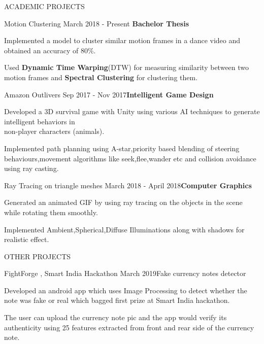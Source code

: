 \documentclass{resume} %
\begin{document}
\begin{rSection}{ACADEMIC PROJECTS}
\begin{rSubsection}{Motion Clustering} {March 2018 - Present }{\textbf{Bachelor Thesis}}{}
\item Implemented a model to cluster similar motion frames in a dance video and obtained an accuracy of 80\%.
\item Used \textbf{Dynamic Time Warping}(DTW) for measuring similarity between two motion frames and \textbf{Spectral Clustering} for clustering them.
\end{rSubsection}  


\begin{rSubsection}{Amazon Outlivers} {Sep 2017 - Nov 2017}{\textbf{Intelligent Game Design}}{}

\item Developed a 3D survival game with Unity using various AI techniques to generate intelligent behaviors in \\non-player characters (animals).
\item Implemented path planning using A-star,priority based blending of steering behaviours,movement algorithms like seek,flee,wander etc and collision avoidance using ray casting.
\end{rSubsection}  




\begin{rSubsection}{Ray Tracing on triangle meshes} {March 2018 - April 2018}{\textbf{Computer Graphics }}{}

\item Generated an animated GIF by using ray tracing on the objects in the scene while rotating them smoothly.
\item Implemented Ambient,Spherical,Diffuse Illuminations along with shadows for realistic effect.
\end{rSubsection}  






\end{rSection} 



\begin{rSection}{OTHER PROJECTS}

\begin{rSubsection}{FightForge , Smart India Hackathon} {March 2019}{Fake currency notes detector}{}
\item Developed an android app which uses Image Processing to detect whether the note was fake or real which bagged first prize at Smart India hackathon.           
\item The user can upload the currency note pic and the app would verify its authenticity using 25 features extracted from front and rear side of the currency note.
\end{rSubsection}

\end{rSection}
\end{document}
